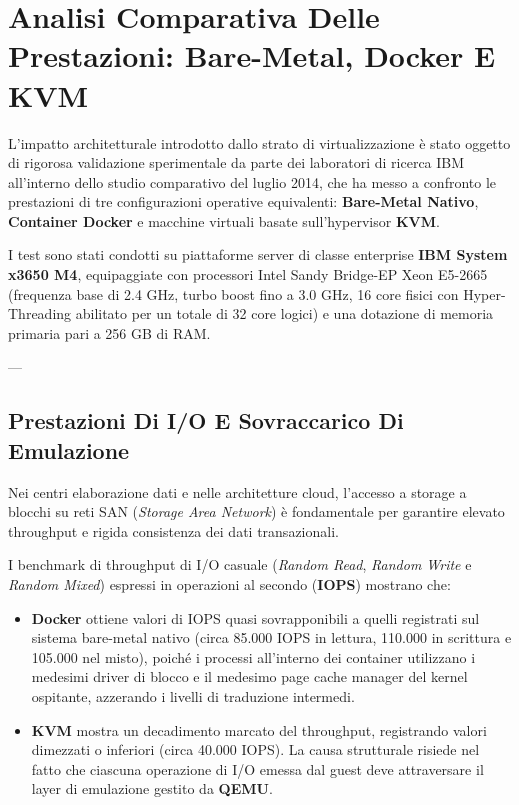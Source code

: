 \documentclass[11pt, a4paper]{article}
\begin{document}
\newpage


\section{Analisi Comparativa Delle Prestazioni: Bare-Metal, Docker E KVM}

L'impatto architetturale introdotto dallo strato di virtualizzazione è stato oggetto di rigorosa validazione sperimentale da parte dei laboratori di ricerca IBM all'interno dello studio comparativo del luglio 2014, che ha messo a confronto le prestazioni di tre configurazioni operative equivalenti: \textbf{Bare-Metal Nativo}, \textbf{Container Docker} e macchine virtuali basate sull'hypervisor \textbf{KVM}.

I test sono stati condotti su piattaforme server di classe enterprise \textbf{IBM System x3650 M4}, equipaggiate con processori Intel Sandy Bridge-EP Xeon E5-2665 (frequenza base di 2.4 GHz, turbo boost fino a 3.0 GHz, 16 core fisici con Hyper-Threading abilitato per un totale di 32 core logici) e una dotazione di memoria primaria pari a 256 GB di RAM.

---

\subsection{Prestazioni Di I/O E Sovraccarico Di Emulazione}

Nei centri elaborazione dati e nelle architetture cloud, l'accesso a storage a blocchi su reti SAN (\emph{Storage Area Network}) è fondamentale per garantire elevato throughput e rigida consistenza dei dati transazionali.


I benchmark di throughput di I/O casuale (\emph{Random Read}, \emph{Random Write} e \emph{Random Mixed}) espressi in operazioni al secondo (\textbf{IOPS}) mostrano che:
\begin{itemize}
    \item \textbf{Docker} ottiene valori di IOPS quasi sovrapponibili a quelli registrati sul sistema bare-metal nativo (circa 85.000 IOPS in lettura, 110.000 in scrittura e 105.000 nel misto), poiché i processi all'interno dei container utilizzano i medesimi driver di blocco e il medesimo page cache manager del kernel ospitante, azzerando i livelli di traduzione intermedi.
    \item \textbf{KVM} mostra un decadimento marcato del throughput, registrando valori dimezzati o inferiori (circa 40.000 IOPS). La causa strutturale risiede nel fatto che ciascuna operazione di I/O emessa dal guest deve attraversare il layer di emulazione gestito da \textbf{QEMU}.
\end{itemize}
\end{document}

